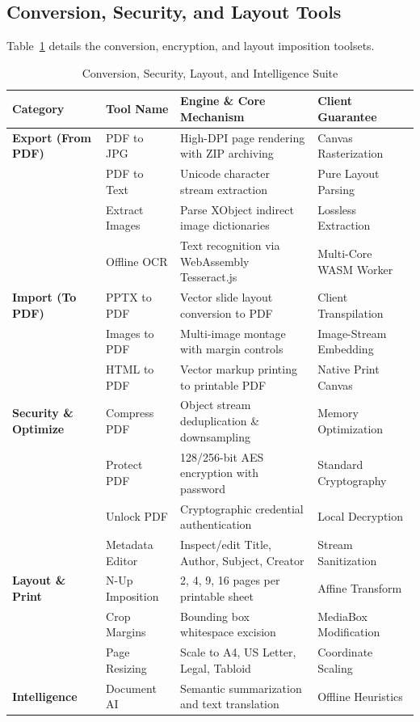 \documentclass[11pt,a4paper]{article}
\begin{document}
\subsection{Conversion, Security, and Layout Tools}
Table~\ref{tab:tools_advanced} details the conversion, encryption, and layout imposition toolsets.

\begin{table}[htbp]
\centering
\caption{Conversion, Security, Layout, and Intelligence Suite}
\label{tab:tools_advanced}
\vspace{0.5em}
\small
\begin{tabularx}{\textwidth}{llXl}
\toprule
\textbf{Category} & \textbf{Tool Name} & \textbf{Engine \& Core Mechanism} & \textbf{Client Guarantee} \\
\midrule
\textbf{Export (From PDF)} & PDF to JPG & High-DPI page rendering with ZIP archiving & Canvas Rasterization \\
& PDF to Text & Unicode character stream extraction & Pure Layout Parsing \\
& Extract Images & Parse XObject indirect image dictionaries & Lossless Extraction \\
& Offline OCR & Text recognition via WebAssembly Tesseract.js & Multi-Core WASM Worker \\
\midrule
\textbf{Import (To PDF)} & PPTX to PDF & Vector slide layout conversion to PDF & Client Transpilation \\
& Images to PDF & Multi-image montage with margin controls & Image-Stream Embedding \\
& HTML to PDF & Vector markup printing to printable PDF & Native Print Canvas \\
\midrule
\textbf{Security \& Optimize} & Compress PDF & Object stream deduplication \& downsampling & Memory Optimization \\
& Protect PDF & 128/256-bit AES encryption with password & Standard Cryptography \\
& Unlock PDF & Cryptographic credential authentication & Local Decryption \\
& Metadata Editor & Inspect/edit Title, Author, Subject, Creator & Stream Sanitization \\
\midrule
\textbf{Layout \& Print} & N-Up Imposition & 2, 4, 9, 16 pages per printable sheet & Affine Transform \\
& Crop Margins & Bounding box whitespace excision & MediaBox Modification \\
& Page Resizing & Scale to A4, US Letter, Legal, Tabloid & Coordinate Scaling \\
\midrule
\textbf{Intelligence} & Document AI & Semantic summarization and text translation & Offline Heuristics \\
\bottomrule
\end{tabularx}
\end{table}
\end{document}
